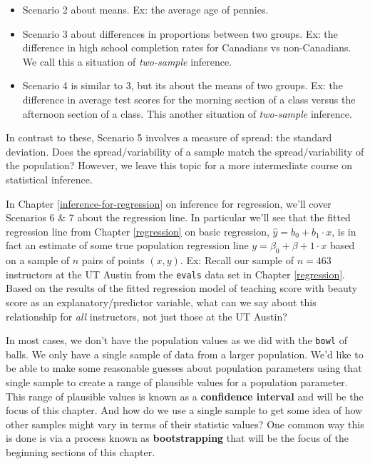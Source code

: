 \documentclass[12pt,]{krantz}
\providecommand{\tightlist}{%
  \setlength{\itemsep}{0pt}\setlength{\parskip}{0pt}}
\begin{document}
\begin{itemize}
\tightlist
\item
  Scenario 2 about means. Ex: the average age of pennies.
\item
  Scenario 3 about differences in proportions between two groups. Ex:
  the difference in high school completion rates for Canadians vs
  non-Canadians. We call this a situation of \emph{two-sample}
  inference.
\item
  Scenario 4 is similar to 3, but its about the means of two groups. Ex:
  the difference in average test scores for the morning section of a
  class versus the afternoon section of a class. This another situation
  of \emph{two-sample} inference.
\end{itemize}

In contrast to these, Scenario 5 involves a measure of spread: the
standard deviation. Does the spread/variability of a sample match the
spread/variability of the population? However, we leave this topic for a
more intermediate course on statistical inference.

In Chapter \ref{inference-for-regression} on inference for regression,
we'll cover Scenarios 6 \& 7 about the regression line. In particular
we'll see that the fitted regression line from Chapter \ref{regression}
on basic regression, \(\widehat{y} = b_0 + b_1 \cdot x\), is in fact an
estimate of some true population regression line
\(y = \beta_0 + \beta+1 \cdot x\) based on a sample of \(n\) pairs of
points \((x, y)\). Ex: Recall our sample of \(n=463\) instructors at the
UT Austin from the \texttt{evals} data set in Chapter \ref{regression}.
Based on the results of the fitted regression model of teaching score
with beauty score as an explanatory/predictor variable, what can we say
about this relationship for \emph{all} instructors, not just those at
the UT Austin?

In most cases, we don't have the population values as we did with the
\texttt{bowl} of balls. We only have a single sample of data from a
larger population. We'd like to be able to make some reasonable guesses
about population parameters using that single sample to create a range
of plausible values for a population parameter. This range of plausible
values is known as a \textbf{confidence interval} and will be the focus
of this chapter. And how do we use a single sample to get some idea of
how other samples might vary in terms of their statistic values? One
common way this is done is via a process known as \textbf{bootstrapping}
that will be the focus of the beginning sections of this chapter.
\end{document}
